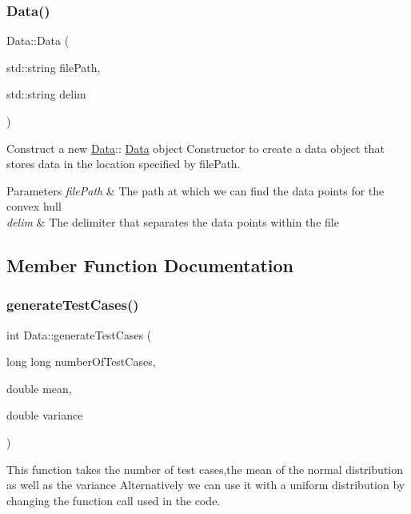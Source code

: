 \subsubsection{\texorpdfstring{Data()}{Data()}}
{\footnotesize\ttfamily Data\+::\+Data (\begin{DoxyParamCaption}\item[{std\+::string}]{file\+Path,  }\item[{std\+::string}]{delim }\end{DoxyParamCaption})}



Construct a new \hyperlink{classData}{Data}\+:\+: \hyperlink{classData}{Data} object Constructor to create a data object that stores data in the location specified by file\+Path. 


\begin{DoxyParams}{Parameters}
{\em file\+Path} & The path at which we can find the data points for the convex hull \\
\hline
{\em delim} & The delimiter that separates the data points within the file \\
\hline
\end{DoxyParams}


\subsection{Member Function Documentation}
\mbox{\label{classData_a5232e86a00b695f2829b8f577a3f9fc1}} 
\subsubsection{\texorpdfstring{generate\+Test\+Cases()}{generateTestCases()}}
{\footnotesize\ttfamily int Data\+::generate\+Test\+Cases (\begin{DoxyParamCaption}\item[{long long}]{number\+Of\+Test\+Cases,  }\item[{double}]{mean,  }\item[{double}]{variance }\end{DoxyParamCaption})}



This function takes the number of test cases,the mean of the normal distribution as well as the variance Alternatively we can use it with a uniform distribution by changing the function call used in the code. 


